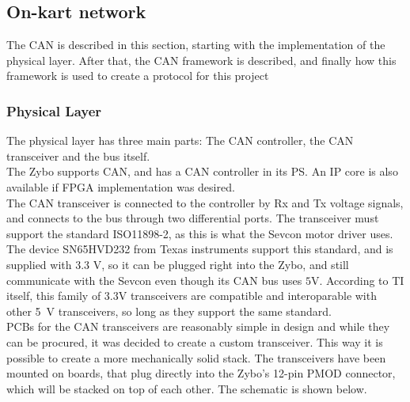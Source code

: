 
\subsection{On-kart network}\label{sec:CANbus}
The CAN is described in this section, starting with the implementation of the physical layer.
After that, the CAN framework is described, and finally how this framework is used to create a protocol for this project

\subsubsection{Physical Layer}\label{sub:CANphys}
The physical layer has three main parts: The CAN controller, the CAN transceiver and the bus itself. \\

The Zybo supports CAN, and has a CAN controller in its PS.
An IP core is also available if FPGA implementation was desired.\\

The CAN transceiver is connected to the controller by Rx and Tx voltage signals, and connects to the bus through two differential ports. 
The transceiver must support the standard ISO11898-2, as this is what the Sevcon motor driver uses.
The device SN65HVD232 from Texas instruments support this standard, and is supplied with 3.3 V, so it can be plugged right into the Zybo, and still communicate with the Sevcon even though its CAN bus uses $\si{5 \volt}$.
According to TI itself\cite{3.3V_CAN}, this family of $\si{3.3 \volt}$ transceivers are compatible and interoparable with other \si{5 \volt} transceivers, so long as they support the same standard.\\

PCBs for the CAN transceivers are reasonably simple in design and while they can be procured, it was decided to create a custom transceiver.
This way it is possible to create a more mechanically solid stack.
The transceivers have been mounted on boards, that plug directly into the Zybo's 12-pin PMOD connector, which will be stacked on top of each other. 
The schematic is shown below.

